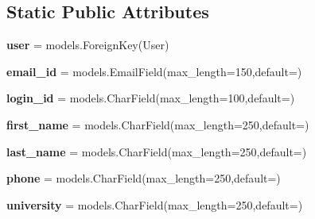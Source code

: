 \subsection*{Static Public Attributes}
\begin{DoxyCompactItemize}
\item 
\mbox{\label{classindex_1_1models_1_1Student_a27b474c91d4370b485687fc734093763}} 
{\bfseries user} = models.\+Foreign\+Key(User)
\item 
\mbox{\label{classindex_1_1models_1_1Student_ad5d615af26e5af2cffa7b32c0286df51}} 
{\bfseries email\+\_\+id} = models.\+Email\+Field(max\+\_\+length=150,default=\textquotesingle{}\textquotesingle{})
\item 
\mbox{\label{classindex_1_1models_1_1Student_adc29034c77610e7c7f17487cc06a0822}} 
{\bfseries login\+\_\+id} = models.\+Char\+Field(max\+\_\+length=100,default=\textquotesingle{}\textquotesingle{})
\item 
\mbox{\label{classindex_1_1models_1_1Student_af6cb61292e389b8c9ce19259aece0c97}} 
{\bfseries first\+\_\+name} = models.\+Char\+Field(max\+\_\+length=250,default=\textquotesingle{}\textquotesingle{})
\item 
\mbox{\label{classindex_1_1models_1_1Student_a78d7e09fef2ba32b251423fea095ec76}} 
{\bfseries last\+\_\+name} = models.\+Char\+Field(max\+\_\+length=250,default=\textquotesingle{}\textquotesingle{})
\item 
\mbox{\label{classindex_1_1models_1_1Student_a45859e5f6ef62fc5c808aa13f91bf6ed}} 
{\bfseries phone} = models.\+Char\+Field(max\+\_\+length=250,default=\textquotesingle{}\textquotesingle{})
\item 
\mbox{\label{classindex_1_1models_1_1Student_ad0a221a7c4df3eb1bd81faa7dfa3feda}} 
{\bfseries university} = models.\+Char\+Field(max\+\_\+length=250,default=\textquotesingle{}\textquotesingle{})
\item 
\mbox{\label{classindex_1_1models_1_1Student_a67529967816652d0b9bfe6a44adc98d9}} 

\end{DoxyCompactItemize}
